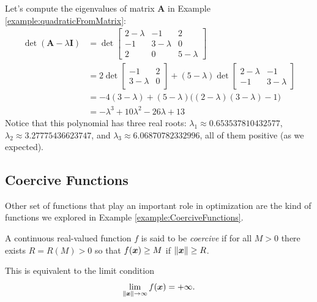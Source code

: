 \begin{example}
Let's compute the eigenvalues of matrix $\boldsymbol{A}$ in Example \ref{example:quadraticFromMatrix}:
\begin{align*}
\det (\boldsymbol{A} - \lambda \boldsymbol{I}) &= \det \begin{bmatrix}
2-\lambda & -1 & 2 \\ -1 & 3-\lambda & 0 \\ 2 & 0 & 5-\lambda \end{bmatrix} \\
& = 2 \det\begin{bmatrix} -1 & 2 \\ 3-\lambda & 0 \end{bmatrix} + (5-\lambda) \det \begin{bmatrix} 2-\lambda & -1 \\ -1 & 3-\lambda \end{bmatrix} \\
&= -4(3-\lambda) + (5-\lambda) \big( (2-\lambda)(3-\lambda) -1 \big) \\
& = -\lambda^3 + 10\lambda^2 - 26\lambda + 13
\end{align*}
Notice that this polynomial has three real roots: $\lambda_1 \approx 0.653537810432577$, $\lambda_2 \approx 3.27775436623747$, and $\lambda_3 \approx 6.06870782332996$, all of them positive (as we expected).
\end{example}

\subsection{Coercive Functions}
Other set of functions that play an important role in optimization are the kind of functions we explored in Example \ref{example:CoerciveFunctions}.

\begin{definition}\label{def:coerciveFunctions}
A continuous real-valued function $f$ is said to be \emph{coercive} if for all $M>0$ there exists $R=R(M)>0$ so that $f(\boldsymbol{x})\geq M$ if $\lVert \boldsymbol{x} \rVert\geq R$.
\end{definition}

\begin{remark}
This is equivalent to the limit condition  
\begin{equation*}
\lim_{\lVert \boldsymbol{x} \rVert\to \infty} f(\boldsymbol{x}) = +\infty.
\end{equation*}
\end{remark}

